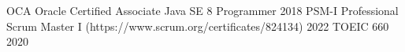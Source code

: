 


\begin{cvhonors}

  \cvhonor
    {OCA} %
    {Oracle Certified Associate Java SE 8 Programmer} %
    {} %
    {2018} %
  \cvhonor
    {PSM-I} %
    {Professional Scrum Master I (https://www.scrum.org/certificates/824134)} %
    {} %
    {2022} %
  \cvhonor
    {TOEIC} %
    {660} %
    {} %
    {2020} %
\end{cvhonors}